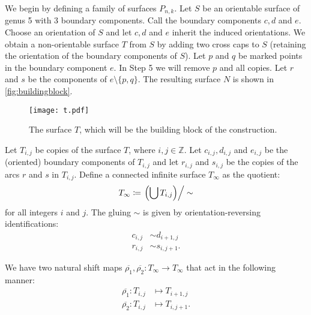 

We begin by defining a family of surfaces $P_{n,k}$. Let $S$ be an orientable surface of genus 5 with 3
boundary components.  Call the boundary components $c,d$ and $e$. Choose an orientation of $S$ and let $c,d$ and $e$ inherit the induced orientations. We obtain a non-orientable surface $T$ from $S$ by adding two cross caps to $S$ (retaining the orientation of the boundary components of $S$). Let $p$ and $q$ be marked points in the boundary component $e$. In Step 5 we will remove $p$ and all copies.  Let  $r$ and
$s$ be the components of $e\setminus\{p,q\}$. The resulting surface $N$ is shown in \autoref{fig:buildingblock}.

\begin{figure}[ht]
    \centering
    \texttt{[image: t.pdf]}
    \caption{The surface $T$, which will be the building block of the construction.}
    \label{fig:buildingblock}
\end{figure}

Let $T_{i,j}$ be copies of the surface $T$, where $i,j \in \mathbb{Z}$. Let $c_{i,j}, d_{i,j}$ and $e_{i,j}$ be the (oriented) boundary components of $T_{i,j}$ and let $r_{i,j}$ and $s_{i,j}$ be the copies of the arcs $r$ and $s$ in $T_{i,j}$. Define a connected infinite surface $T_\infty$ as the quotient:
\begin{align*}
  T_\infty \coloneqq \left. \left( \bigcup T_{i,j} \right)\right/\sim
\end{align*}
for all integers $i$ and $j$. The gluing $\sim$ is given by orientation-reversing identifications:
\begin{align}
\label{identification}
  c_{i,j} &\sim d_{i+1,j} \\
  r_{i,j} &\sim s_{i,j+1}.
\end{align}


We have two
natural shift maps $\overline{\rho_1},\overline{\rho_2}: T_\infty \to T_\infty$ that act in the
following manner:
\begin{align*}
  \overline{\rho_1}: T_{i,j} &\mapsto T_{i+1, j} \\
  \overline{\rho_2}: T_{i,j} &\mapsto T_{i, j+1}.
\end{align*}

